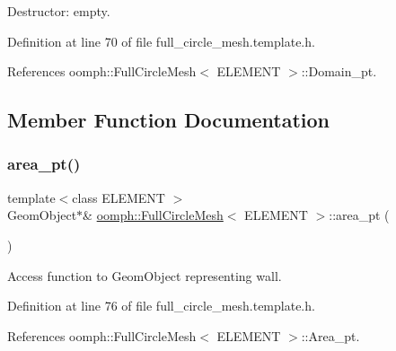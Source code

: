 Destructor\+: empty. 



Definition at line 70 of file full\+\_\+circle\+\_\+mesh.\+template.\+h.



References oomph\+::\+Full\+Circle\+Mesh$<$ E\+L\+E\+M\+E\+N\+T $>$\+::\+Domain\+\_\+pt.



\subsection{Member Function Documentation}
\mbox{\label{classoomph_1_1FullCircleMesh_a0ee479af0a6562231d7a7d1c5533beb9}} 
\subsubsection{\texorpdfstring{area\+\_\+pt()}{area\_pt()}}
{\footnotesize\ttfamily template$<$class E\+L\+E\+M\+E\+NT $>$ \\
Geom\+Object$\ast$\& \hyperlink{classoomph_1_1FullCircleMesh}{oomph\+::\+Full\+Circle\+Mesh}$<$ E\+L\+E\+M\+E\+NT $>$\+::area\+\_\+pt (\begin{DoxyParamCaption}{ }\end{DoxyParamCaption})\hspace{0.3cm}{\ttfamily [inline]}}



Access function to Geom\+Object representing wall. 



Definition at line 76 of file full\+\_\+circle\+\_\+mesh.\+template.\+h.



References oomph\+::\+Full\+Circle\+Mesh$<$ E\+L\+E\+M\+E\+N\+T $>$\+::\+Area\+\_\+pt.

\mbox{\label{classoomph_1_1FullCircleMesh_aade9e5e2a9d65f8b7f5d041da4536d99}} 

